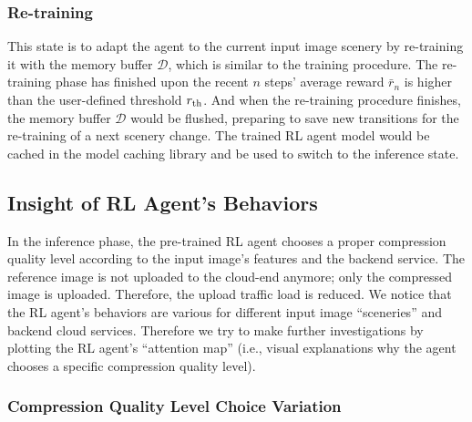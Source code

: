 \subsubsection{Re-training}

This state is to adapt the agent to the current input image scenery by re-training it with the memory buffer $ \mathcal{D} $, which is similar to the training procedure. The re-training phase has finished upon the recent $ n $ steps' average reward $ \bar{r}_n $ is higher than the user-defined threshold $ r_{\rm th} $. And when the re-training procedure finishes, the memory buffer $ \mathcal{D} $ would be flushed, preparing to save new transitions for the re-training of a next scenery change. The trained RL agent model would be cached in the model caching library and be used to switch to the inference state.

\subsection{Insight of RL Agent's Behaviors}
\label{subsec:insight}

In the inference phase, the pre-trained RL agent chooses a proper compression quality level according to the input image's features and the backend service. The reference image is not uploaded to the cloud-end anymore; only the compressed image is uploaded. Therefore, the upload traffic load is reduced. We notice that the RL agent's behaviors are various for different input image ``sceneries'' and backend cloud services. Therefore we try to make further investigations by plotting the RL agent's ``attention map'' (i.e., visual explanations why the agent chooses a specific compression quality level). %

\subsubsection{Compression Quality Level Choice Variation}

